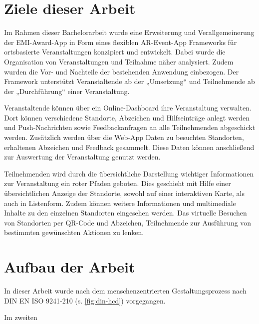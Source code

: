 \section{Ziele dieser Arbeit} \label{sec:goals}

Im Rahmen dieser Bachelorarbeit wurde eine Erweiterung und Verallgemeinerung der
EMI-Award-App in Form eines flexiblen AR-Event-App Frameworks für ortsbasierte
Veranstaltungen konzipiert und entwickelt. Dabei wurde die Organisation von
Veranstaltungen und Teilnahme näher analysiert. Zudem wurden die Vor- und
Nachteile der bestehenden Anwendung einbezogen. Der Framework unterstützt
Veranstaltende ab der „Umsetzung“ und Teilnehmende ab der „Durchführung“ einer Veranstaltung.

Veranstaltende können über ein Online-Dashboard ihre Veranstaltung verwalten.
Dort können verschiedene Standorte, Abzeichen und Hilfseinträge anlegt werden
und Push-Nachrichten sowie Feedbackanfragen an alle Teilnehmenden abgeschickt
werden. Zusätzlich werden über die Web-App Daten zu besuchten Standorten,
erhaltenen Abzeichen und Feedback gesammelt. Diese Daten können anschließend zur
Auswertung der Veranstaltung genutzt werden.

Teilnehmenden wird durch die übersichtliche Darstellung wichtiger Informationen
zur Veranstaltung ein roter Pfaden geboten. Dies geschieht mit Hilfe einer
übersichtlichen Anzeige der Standorte, sowohl auf einer interaktiven Karte,
als auch in Listenform. Zudem können weitere Informationen und
multimediale Inhalte zu den einzelnen Standorten eingesehen werden. Das virtuelle Besuchen von Standorten per QR-Code und Abzeichen,
Teilnehmende zur Ausführung von bestimmten gewünschten Aktionen zu lenken.

\section{Aufbau der Arbeit}


In dieser Arbeit wurde nach dem menschenzentrierten Gestaltungsprozess nach DIN
EN ISO 9241-210 (s. \autoref{fig:din-hcd}) vorgegangen.

Im zweiten

